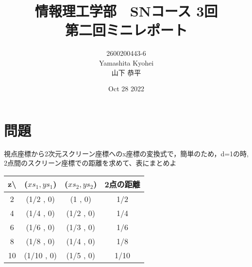\documentclass[dvipdfmx,autodetect-engine,titlepage]{jsarticle}
\title{情報理工学部　SNコース 3回\\
第二回ミニレポート\\}
\author{2600200443-6\\Yamashita Kyohei\\山下 恭平}
\date{Oct 28 2022}
\begin{document}
\maketitle

\section*{問題}
視点座標から2次元スクリーン座標へのx座標の変換式で，簡単のため，d=1の時,
2点間のスクリーン座標での距離を求めて、表にまとめよ
\begin{table}[h]
  \centering
  \begin{tabular}{|c|c|c|c|}
  \hline
  z\textbackslash{} & (\begin{math}xs_1 , ys_1\end{math}) & (\begin{math}xs_2 , ys_2\end{math}) & 2点の距離   \\ \hline
  2                 & (1/2 , 0)       & (1 , 0)         & 1/2  \\ \hline
  4                 & (1/4 , 0)       & (1/2 , 0)       & 1/4  \\ \hline
  6                 & (1/6 , 0)       & (1/3 , 0)       & 1/6  \\ \hline
  8                 & (1/8 , 0)       & (1/4 , 0)       & 1/8  \\ \hline
  10                & (1/10 , 0)      & (1/5 , 0)       & 1/10 \\ \hline
  \end{tabular}
  \end{table}
\end{document}
